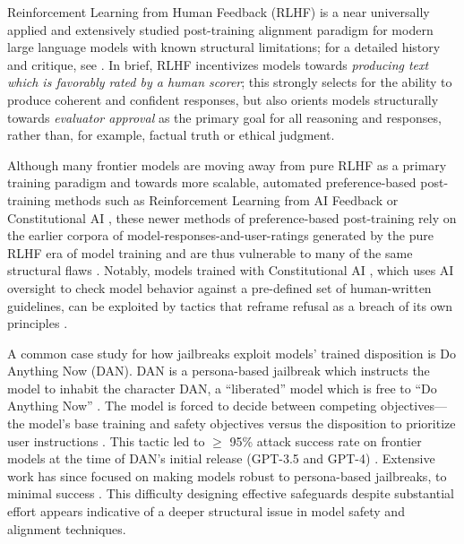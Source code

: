 Reinforcement Learning from Human Feedback (RLHF) is a near universally applied \cite{openai_gpt-4_2023, anthropic_introducing_2023, touvron_llama_2023, google_deepmind_gemini_2026, xai_introducing_2026} and extensively studied post-training alignment paradigm for modern large language models with known structural limitations; for a detailed history and critique, see \citet{casper_open_2023}. In brief, RLHF incentivizes models towards \textit{producing text which is favorably rated by a human scorer}; this strongly selects for the ability to produce coherent and confident responses, but also orients models structurally towards \textit{evaluator approval} as the primary goal for all reasoning and responses, rather than, for example, factual truth or ethical judgment.

Although many frontier models are moving away from pure RLHF as a primary training paradigm and towards more scalable, automated preference-based post-training methods such as Reinforcement Learning from AI Feedback or Constitutional AI \cite{anthropic_system_2026-1, anthropic_system_2026-2, openai_gpt-6_2026, deepseek-ai_deepseek-v41-flash_2026, qwen_team_qwen38-max_2026}, these newer methods of preference-based post-training rely on the earlier corpora of model-responses-and-user-ratings generated by the pure RLHF era of model training and are thus vulnerable to many of the same structural flaws \cite{bai_constitutional_2022, lee_rlaif_2024, srivastava_technical_2026}. Notably, models trained with Constitutional AI \cite{bai_constitutional_2022}, which uses AI oversight to check model behavior against a pre-defined set of human-written guidelines, can be exploited by tactics that reframe refusal as a breach of its own principles \cite{spiritual_spell_jailbreaking_2026}. 

A common case study for how jailbreaks exploit models' trained disposition is Do Anything Now (DAN). DAN is a persona-based jailbreak which instructs the model to inhabit the character DAN, a ``liberated'' model which is free to ``Do Anything Now'' \cite{shen_anything_2024, yu_dont_2024}. The model is forced to decide between competing objectives---the model's base training and safety objectives versus the disposition to prioritize user instructions \cite{wei_jailbroken_2023}. This tactic led to $\geq$ 95\% attack success rate on frontier models at the time of DAN's initial release (GPT-3.5 and GPT-4) \cite{shen_anything_2024}. Extensive work has since focused on making models robust to persona-based jailbreaks, to minimal success \cite{wei_jailbroken_2023, qin_knowing-but-doing_2026, qiu_personabreak_2026, li_disentangling_2026}. This difficulty designing effective safeguards despite substantial effort appears indicative of a deeper structural issue in model safety and alignment techniques.

